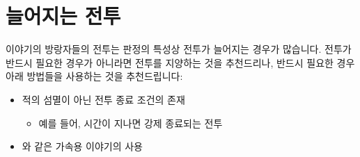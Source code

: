 \documentclass{report}
\begin{document}
	\section*{늘어지는 전투}
	이야기의 방랑자들의 전투는 판정의 특성상 전투가 늘어지는 경우가 많습니다. 전투가 반드시 필요한 경우가 아니라면 전투를 지양하는 것을 추천드리나, 반드시 필요한 경우 아래 방법들을 사용하는 것을 추천드립니다:
	\begin{itemize}
		\item 적의 섬멸이 아닌 전투 종료 조건의 존재
		\begin{itemize}
			\item 예를 들어, 시간이 지나면 강제 종료되는 전투
		\end{itemize}
		\item {}와 같은 가속용 이야기의 사용
	\end{itemize}
\end{document}
